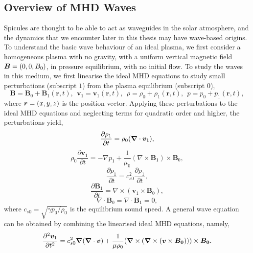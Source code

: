 \subsection{Overview of MHD Waves}
\label{section:mhd_Waves}
Spicules are thought to be able to act as waveguides in the solar atmosphere, and the dynamics that we encounter later in this thesis may have wave-based origins. To understand the basic wave behaviour of an ideal plasma, we first consider a homogeneous plasma with no gravity, with a uniform vertical magnetic field $\boldsymbol{B}=(0,0,B_0)$, in pressure equilibrium, with no initial flow. To study the waves in this medium, we first linearise the ideal MHD equations to study small perturbations (subscript $1$) from the plasma equilibrium (subscript $0$),
\begin{equation} \label{eq91}
\boldsymbol{B} = \boldsymbol{B}_0 + \boldsymbol{B}_1 (\boldsymbol{r},t) , \ \ \boldsymbol{v}_1 = \boldsymbol{v}_1 (\boldsymbol{r}, t) , \ \ \rho = \rho_0 + \rho_1 ( \boldsymbol{r},t) , \ \ p = p_0 + p_1 ( \boldsymbol{r}, t) ,
\end{equation}
where $\boldsymbol{r} = (x,y,z)$ is the position vector. Applying these perturbations to the ideal MHD equations and neglecting terms for quadratic order and higher, the perturbations yield,
\begin{equation}\label{mhd_lin1}
\frac{\partial \rho_1}{\partial t} = \rho_0 ( \boldsymbol{\nabla} \cdot \boldsymbol{v}_1),
\end{equation}
\begin{equation}
\rho_0 \frac{\partial \boldsymbol{v}_1}{\partial t}  = - \nabla p_1 + \frac{1}{\mu_0} (\nabla \times \boldsymbol{B}_1) \times \boldsymbol{B}_0,
\end{equation}
\begin{equation}
\frac{\partial p_1}{\partial t} = c^2_{s0}  \frac{\partial \rho_1}{ \partial t},
\end{equation}
\begin{equation}
\frac{\partial \boldsymbol{B}_1}{\partial t} = \nabla \times (\boldsymbol{v}_1 \times \boldsymbol{B}_0),
\end{equation}
\begin{equation}\label{mhd_lin2}
\nabla \cdot \boldsymbol{B}_0 = \nabla \cdot \boldsymbol{B}_1 = 0 ,
\end{equation}
where $c_{s0} = \sqrt{\gamma p_0/ \rho_0}$ is the equilibrium sound speed. A general wave equation can be obtained by combining the linearised ideal MHD equations, namely,
\begin{equation}\label{wave_eq}
    \frac{\partial^2 \boldsymbol{v}_1}{\partial t^2} = c_{s0}^2 \boldsymbol{\nabla} (\boldsymbol{\nabla} \cdot \boldsymbol{v}) + \frac{1}{\mu \rho_0} (\boldsymbol{\nabla} \times (\boldsymbol{\nabla} \times (\boldsymbol{v}\times\boldsymbol{B_0}))) \times \boldsymbol{B_0}.
\end{equation}
